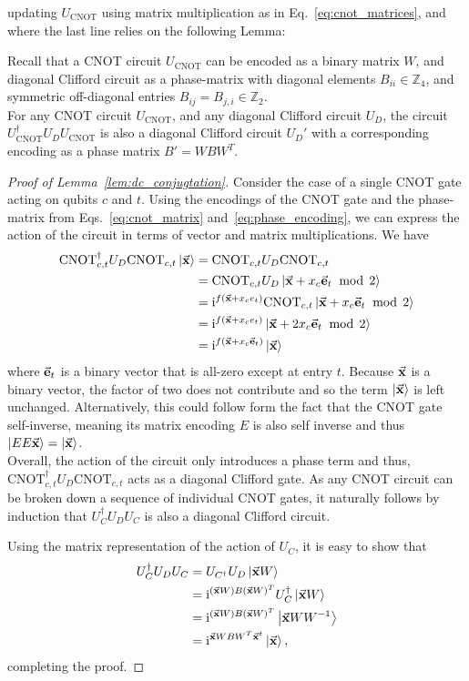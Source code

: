 updating $U_{\text{CNOT}}$ using matrix multiplication as in Eq.~\ref{eq:cnot_matrices}, and where the last line relies on the following Lemma:
\begin{lem}
Recall that a CNOT circuit $U_{\text{CNOT}}$ can be encoded as a binary matrix $W$, and diagonal Clifford circuit as a phase-matrix with diagonal elements $B_{ii}\in\mathbb{Z}_{4}$, and symmetric off-diagonal entries $B_{ij}=B_{j,i}\in\mathbb{Z}_{2}$.\\
For any CNOT circuit $U_{\text{CNOT}}$, and any diagonal Clifford circuit $U_{D}$, the circuit $U_{\text{CNOT}}^{\dagger}U_{D}U_{\text{CNOT}}$ is also a diagonal Clifford circuit $U_{D}'$ with a corresponding encoding as a phase matrix $B'=WBW^{T}$.\label{lem:dc_conjugtation}
\end{lem}
\begin{proof}[Proof of Lemma~\ref{lem:dc_conjugtation}]
Consider the case of a single CNOT gate acting on qubits $c$ and $t$. Using the encodings of the CNOT gate and the phase-matrix from Eqs.~\ref{eq:cnot_matrix} and~\ref{eq:phase_encoding}, we can express the action of the circuit in terms of vector and matrix multiplications. We have
\begin{align}
\text{CNOT}_{c,t}^{\dagger} U_{D} \text{CNOT}_{c,t}\ket{\va{x}} &= \text{CNOT}_{c,t} U_{D} \text{CNOT}_{c,t} \nonumber \\
&= \text{CNOT}_{c,t} U_{D} \ket{\va{x} + x_{c}\va{e}_{t}\;\bmod\,2} \nonumber \\
&= \mathrm{i}^{f(\va{x} + x_{c}e_{t})} \text{CNOT}_{c,t} \ket{\va{x} + x_{c}\va{e}_{t}\;\bmod\,2} \nonumber \\
&= \mathrm{i}^{f(\va{x} + x_{c}e_{t})} \ket{\va{x} + 2x_{c}\va{e}_{t}\;\bmod\,2} \nonumber \\
&= \mathrm{i}^{f(\va{x}+x_{c}\va{e}_{t})}\ket{\va{x}}
\end{align}
where $\va{e}_{t}$ is a binary vector that is all-zero except at entry $t$. Because $\va{x}$ is a binary vector, the factor of two does not contribute and so the term $\ket{\va{x}}$ is left unchanged. Alternatively, this could follow form the fact that the CNOT gate self-inverse, meaning its matrix encoding $E$ is also self inverse and thus $\ket{EE\va{x}}=\ket{\va{x}}$.\\
Overall, the action of the circuit only introduces a phase term and thus, $\text{CNOT}_{c,t}^{\dagger}U_{D}\text{CNOT}_{c,t}$ acts as a diagonal Clifford gate. As any CNOT circuit can be broken down a sequence of individual CNOT gates, it naturally follows by induction that $U_{C}^{\dagger}U_{D}U_{C}$ is also a diagonal Clifford circuit.\par
Using the matrix representation of the action of $U_{C}$, it is easy to show that
\begin{align}
U_{C}^{\dagger}U_{D}U_{C} &= U_{C^{\dagger}}U_{D}\ket{\va{x}W} \nonumber \\
&= \mathrm{i}^{(\va{x}W)B(\va{x}W)^{T}}U_{C}^{\dagger}\ket{\va{x}W} \nonumber \\
&= \mathrm{i}^{(\va{x}W)B(\va{x}W)^{T}}\ket{\va{x}WW^{-1}} \nonumber \\
&= \mathrm{i}^{\va{x}WBW^{T}\va{x}^{t}}\ket{\va{x}},
\label{eq:cdc}
\end{align}
completing the proof.
\end{proof}
